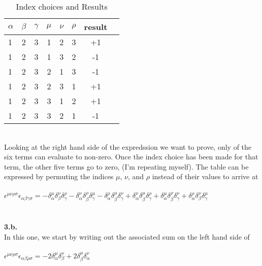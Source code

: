 \documentclass[prb,preprint]
{revtex4-1}
\newcommand{\PRLsep}{\noindent\makebox[\linewidth]{\resizebox{0.8888\linewidth}{2pt}{$\bullet$}}\bigskip}
\begin{document}
\begin{table}[h!]
\centering
\caption{Index choices and Results}
\begin{ruledtabular}
\begin{tabular}{l c c c c c c p{5cm}}
$\alpha$ & $\beta$ & $\gamma$ & $\mu$ & $\nu$ & $\rho$ & result \\
\hline	%
1 & 2 & 3 & 1 & 2 & 3 & +1 \\
1 & 2 & 3 & 1 & 3 & 2 & -1 \\
1 & 2 & 3 & 2 & 1 & 3 & -1 \\
1 & 2 & 3 & 2 & 3 & 1 & +1 \\
1 & 2 & 3 & 3 & 1 & 2 & +1 \\
1 & 2 & 3 & 3 & 2 & 1 & -1 \\
\end{tabular}
\end{ruledtabular}
\label{bosons}
\end{table}
\\
Looking at the right hand side of the expredssion we want to prove, only of the six terms can evaluate to non-zero.  Once the index choice has been made for that term, the other five terms go to zero, (I'm repeating myself).  The table can be expressed by permuting the indices $\mu$, $\nu$, and $\rho$ instead of their values to arrive at
\\
\\
$\epsilon^{\mu\nu\rho\sigma}\epsilon_{\alpha\beta\gamma\sigma} = -\delta^\mu_\alpha \delta^\nu_\beta \delta^\rho_\gamma - \delta^\nu_\alpha \delta^\rho_\beta \delta^\mu_\gamma - \delta^\rho_\alpha \delta^\mu_\beta \delta^\nu_\gamma + \delta^\nu_\alpha \delta^\mu_\beta \delta^\rho_\gamma + \delta^\mu_\alpha \delta^\rho_\beta \delta^\nu_\gamma + \delta^\rho_\alpha \delta^\nu_\beta \delta^\mu_\gamma$
\\
\PRLsep
\\
\\
\textbf{3.b.}
\\
In this one,  we start by writing out the associated sum on the left hand side of 
\\
\\
$\epsilon^{\mu\nu\rho\sigma}\epsilon_{\alpha\beta\rho\sigma} = -2\delta^\mu_\alpha\delta^\nu_\beta + 2\delta^\mu_\beta\delta^\nu_\alpha$
\end{document}
